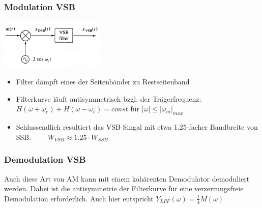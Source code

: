 	\subsubsection{Modulation VSB}
		\begin{minipage}[t][2.2cm][c]{5.5cm}
    		\includegraphics[width=5cm]{bilder/am_vsb_modulator.png}
		\end{minipage}
		\begin{minipage}[t][2.2cm][c]{12.5cm}	
			\begin{itemize}
				\item Filter d\"ampft eines der Seitenbänder zu Restseitenband
				\item Filterkurve läuft antisymmetrisch bzgl. der Trägerfrequenz: \\
				$H(\omega +
				\omega_c) + H(\omega - \omega_c) = const$ für $|\omega| \leq |\omega_m|_{max}$
				\item Schlussendlich resultiert das VSB-Singal  mit etwa 1.25-facher Bandbreite von SSB. $ \qquad  W_{VSB} \approx 1.25 \cdot W_{SSB} $
			\end{itemize}
		\end{minipage}


\subsubsection{Demodulation VSB}
	Auch diese Art von AM kann mit einem kohärenten Demodulator demoduliert werden. Dabei ist die antisymmetrie der Filterkurve für eine verzerrungsfreie Demodulation erforderlich.
	Auch hier entspricht $Y_{LPF}(\omega) = \frac{1}{4}M(\omega)$


